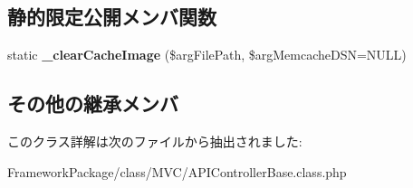 \subsection*{静的限定公開メンバ関数}
\begin{DoxyCompactItemize}
\item 
\hypertarget{class_a_p_i_controller_base_af4481a33cc0b486ed1853937902e13aa}{}static {\bfseries \+\_\+clear\+Cache\+Image} (\$arg\+File\+Path, \$arg\+Memcache\+D\+S\+N=N\+U\+L\+L)\label{class_a_p_i_controller_base_af4481a33cc0b486ed1853937902e13aa}

\end{DoxyCompactItemize}
\subsection*{その他の継承メンバ}


このクラス詳解は次のファイルから抽出されました\+:\begin{DoxyCompactItemize}
\item 
Framework\+Package/class/\+M\+V\+C/A\+P\+I\+Controller\+Base.\+class.\+php\end{DoxyCompactItemize}
